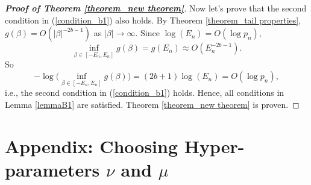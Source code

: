\documentclass[12pt]{article}
\begin{document}
\begin{proof} [\textbf{Proof of Theorem \ref{theorem_new theorem}}]

	Now let's prove that the second condition  in  (\ref{condition_b1}) also holds.
	By Theorem \ref{theorem_tail properties}, $g(\beta)  = O(|\beta|^{-2b-1})$ as $|\beta|\rightarrow\infty$.  Since $\log(E_n ) = O(\log p_n)$,
	\[
	\inf _{ \beta \in [-E_n, E_n]} g(\beta) = g(E_n) \approx O(E_n^{-2b-1}).
	\]
	So
	\[
	-\log\big(\inf _{ \beta \in [-E_n, E_n]} g(\beta)  \big)  =  (2b+1)\log(E_n) =   O( \log p_n),
	\]
	i.e.,  the second condition in  (\ref{condition_b1}) holds. Hence, all conditions in  Lemma  \ref{lemmaB1} are satisfied.
	Theorem  \ref{theorem_new theorem}  is proven.
\end{proof}


\section{Appendix: Choosing Hyper-parameters $\nu$ and $\mu$}
\end{document}
